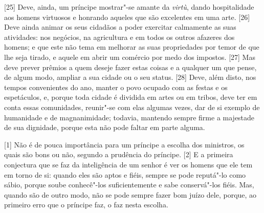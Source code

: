 {[}25{]} Deve, ainda, um príncipe mostrar"-se amante da \emph{virtù},
dando hospitalidade aos homens virtuosos e honrando aqueles que são
excelentes em uma arte. {[}26{]} Deve ainda animar os seus cidadãos a
poder exercitar calmamente as suas atividades: nos negócios, na
agricultura e em todos os outros afazeres dos homens; e que
este não tema em melhorar as suas propriedades
por temor de que lhe seja tirado, e aquele em abrir um comércio por medo
dos impostos. {[}27{]} Mas deve prever prêmios a quem deseje fazer estas
coisas e a qualquer um que pense, de algum modo, ampliar a sua cidade ou
o seu status. {[}28{]} Deve, além disto, nos tempos convenientes do ano,
manter o povo ocupado com as festas e os espetáculos, e, porque toda
cidade é dividida em artes ou em tribos, deve ter em conta essas
comunidades, reunir"-se com elas algumas vezes, dar de si exemplo de
humanidade e de magnanimidade; todavia, mantendo sempre firme a
majestade de sua dignidade, porque esta não pode faltar em parte
alguma.


{[}1{]} Não é de pouca importância para um príncipe a escolha dos
ministros, os quais são bons ou não, segundo a prudência do príncipe.
{[}2{]} E a primeira conjectura que se faz da inteligência de um senhor
é ver os homens que ele tem em torno de si: quando eles são aptos e
fiéis, sempre se pode reputá"-lo como sábio, porque soube conhecê"-los
suficientemente e sabe conservá"-los fiéis. Mas, quando são de outro
modo, não se pode sempre fazer bom juízo dele, porque, ao primeiro erro
que o príncipe faz, o faz nesta escolha.

